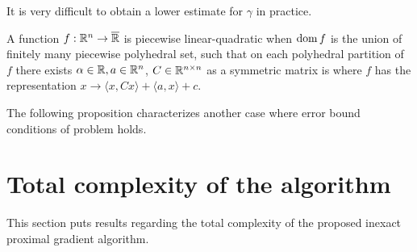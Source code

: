 \documentclass[12pt]{article}
\begin{document}
        \begin{remark}
            It is very difficult to obtain a lower estimate for $\gamma$ in practice. 
        \end{remark}
        \begin{definition}
            A function $f: \mathbb R^n \rightarrow \overline {\mathbb R}$ is piecewise linear-quadratic when $\operatorname{dom} f$ is the union of finitely many piecewise polyhedral set, such that on each polyhedral partition of $f$ there exists $\alpha \in \mathbb R, a \in \mathbb R^n$, $C\in \mathbb R^{n \times n}$ as a symmetric matrix is where $f$ has the representation $x \rightarrow \langle x, Cx\rangle + \langle a, x\rangle + c$. 
        \end{definition}
        The following proposition characterizes another case where error bound conditions of problem holds. 
        \begin{proposition}\label{prop:plq-pp}
            
        \end{proposition}
        \begin{proposition}\label{prop:plq-prox-problem}
            
        \end{proposition}
        \begin{example}\label{example:inn-lp-lin-cnvg}
            
        \end{example}



\section{Total complexity of the algorithm}
    This section puts results regarding the total complexity of the proposed inexact proximal gradient algorithm. 
\end{document}
